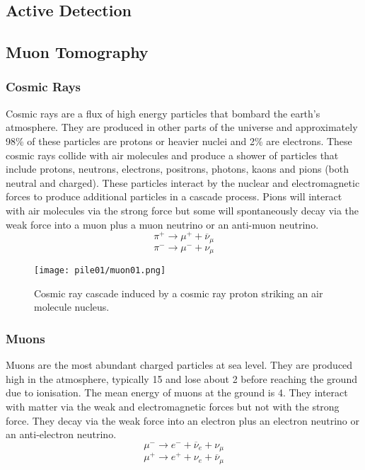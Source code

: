 \documentclass[twoside,titlepage,11pt,twocolumn,a4paper]{article}
\begin{document}
\subsection{Active Detection}

\subsection{Muon Tomography}
\subsubsection{Cosmic Rays}
Cosmic rays are a flux of high energy particles that bombard the
earth’s atmosphere. They are produced in other parts of the universe
and approximately 98\% of these particles are protons or heavier
nuclei and 2\% are electrons. These cosmic rays collide with air
molecules and produce a shower of particles that include protons,
neutrons, electrons, positrons, photons, kaons and pions (both neutral
and charged). These particles interact by the nuclear and
electromagnetic forces to produce additional particles in a cascade
process. Pions will interact with air molecules via the strong force
but some will spontaneously decay via the weak force into a muon plus
a muon neutrino or an anti-muon neutrino. \citep{muonManual2005}
\[ \pi^+ \rightarrow \mu^+ + \overline{\nu}_\mu \]
\[ \pi^- \rightarrow \mu^- + \nu_\mu \]

\begin{figure}
  \texttt{[image: pile01/muon01.png]}
  \caption{Cosmic ray cascade induced by a cosmic ray proton striking
    an air molecule nucleus. \citep{muonManual2005}}
\end{figure}

\subsubsection{Muons}
Muons are the most abundant charged particles at sea level. They are
produced high in the atmosphere, typically \unit{15}{\kilo\metre} and
lose about \unit{2}{\giga\electronvolt} before reaching the ground due
to ionisation. The mean energy of muons at the ground is
\unit{4}{\giga\electronvolt}. \citep{PDG2011} They interact with
matter via the weak and electromagnetic forces but not with the strong
force. They decay via the weak force into an electron plus an electron
neutrino or an anti-electron neutrino.
\[ \mu^- \rightarrow e^- + \overline{\nu}_e + \nu_\mu \]
\[ \mu^+ \rightarrow e^+ + \nu_e + \overline{\nu}_\mu \]
\end{document}
